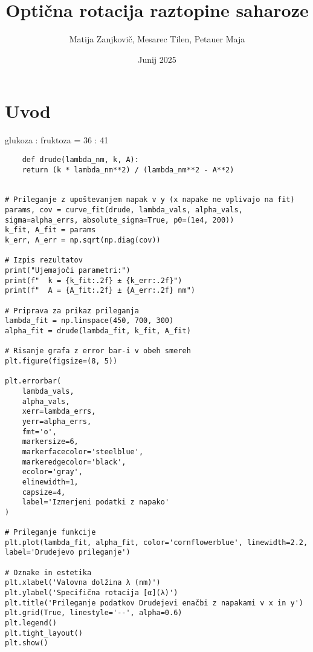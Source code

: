\documentclass[20pt]{extarticle}
\title{Optična rotacija raztopine saharoze}
\author{Matija Zanjkovič, Mesarec Tilen, Petauer Maja}
\date{Junij 2025}
\begin{document}
\maketitle

\section*{Uvod}

glukoza : fruktoza = 36 : 41


\begin{verbatim}
    def drude(lambda_nm, k, A):
    return (k * lambda_nm**2) / (lambda_nm**2 - A**2)


# Prileganje z upoštevanjem napak v y (x napake ne vplivajo na fit)
params, cov = curve_fit(drude, lambda_vals, alpha_vals, sigma=alpha_errs, absolute_sigma=True, p0=(1e4, 200))
k_fit, A_fit = params
k_err, A_err = np.sqrt(np.diag(cov))

# Izpis rezultatov
print("Ujemajoči parametri:")
print(f"  k = {k_fit:.2f} ± {k_err:.2f}")
print(f"  A = {A_fit:.2f} ± {A_err:.2f} nm")

# Priprava za prikaz prileganja
lambda_fit = np.linspace(450, 700, 300)
alpha_fit = drude(lambda_fit, k_fit, A_fit)

# Risanje grafa z error bar-i v obeh smereh
plt.figure(figsize=(8, 5))

plt.errorbar(
    lambda_vals,
    alpha_vals,
    xerr=lambda_errs,
    yerr=alpha_errs,
    fmt='o',
    markersize=6,
    markerfacecolor='steelblue',
    markeredgecolor='black',
    ecolor='gray',
    elinewidth=1,
    capsize=4,
    label='Izmerjeni podatki z napako'
)

# Prileganje funkcije
plt.plot(lambda_fit, alpha_fit, color='cornflowerblue', linewidth=2.2, label='Drudejevo prileganje')

# Oznake in estetika
plt.xlabel('Valovna dolžina λ (nm)')
plt.ylabel('Specifična rotacija [α](λ)')
plt.title('Prileganje podatkov Drudejevi enačbi z napakami v x in y')
plt.grid(True, linestyle='--', alpha=0.6)
plt.legend()
plt.tight_layout()
plt.show()
\end{verbatim}
\end{document}
